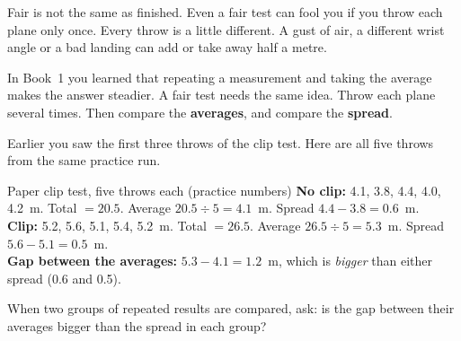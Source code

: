 \label{ch4}

Fair is not the same as finished. Even a fair test can fool you if you throw each plane only once. Every throw is a little different. A gust of air, a different wrist angle or a bad landing can add or take away half a metre.

In Book~1 you learned that repeating a measurement and taking the average makes the answer steadier. A fair test needs the same idea. Throw each plane several times. Then compare the \textbf{averages}, and compare the \textbf{spread}.

Earlier you saw the first three throws of the clip test. Here are all five throws from the same practice run.

\begin{worked}{Paper clip test, five throws each (practice numbers)}
\textbf{No clip:} 4.1, 3.8, 4.4, 4.0, 4.2~m. Total $=20.5$. Average $20.5\div5=4.1$~m. Spread $4.4-3.8=0.6$~m.\\
\textbf{Clip:} 5.2, 5.6, 5.1, 5.4, 5.2~m. Total $=26.5$. Average $26.5\div5=5.3$~m. Spread $5.6-5.1=0.5$~m.\\
\textbf{Gap between the averages:} $5.3-4.1=1.2$~m, which is \emph{bigger} than either spread (0.6 and 0.5).
\end{worked}

\begin{center}
\end{center}

When two groups of repeated results are compared, ask: is the gap between their averages bigger than the spread in each group?

